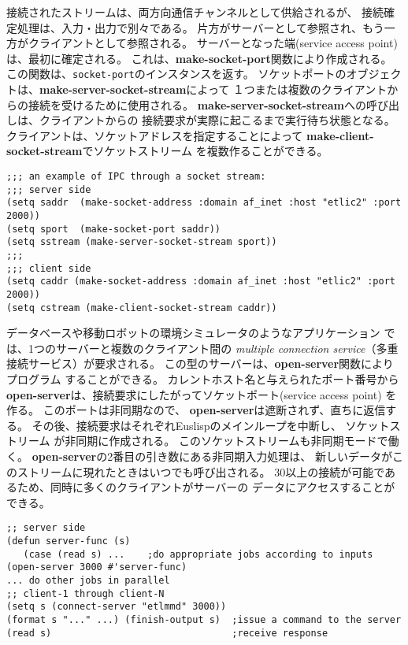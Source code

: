 接続されたストリームは、両方向通信チャンネルとして供給されるが、
接続確定処理は、入力・出力で別々である。
片方がサーバーとして参照され、もう一方がクライアントとして参照される。
サーバーとなった端(service access point)は、最初に確定される。
これは、{\bf make-socket-port}関数により作成される。
この関数は、{\tt socket-port}のインスタンスを返す。
ソケットポートのオブジェクトは、{\bf make-server-socket-stream}によって
１つまたは複数のクライアントからの接続を受けるために使用される。
{\bf make-server-socket-stream}への呼び出しは、クライアントからの
接続要求が実際に起こるまで実行待ち状態となる。
クライアントは、ソケットアドレスを指定することによって
{\bf make-client-socket-stream}でソケットストリーム
を複数作ることができる。

\begin{verbatim}
;;; an example of IPC through a socket stream:
;;; server side
(setq saddr  (make-socket-address :domain af_inet :host "etlic2" :port 2000))
(setq sport  (make-socket-port saddr))
(setq sstream (make-server-socket-stream sport))
;;;
;;; client side
(setq caddr (make-socket-address :domain af_inet :host "etlic2" :port 2000))
(setq cstream (make-client-socket-stream caddr))
\end{verbatim}

データベースや移動ロボットの環境シミュレータのようなアプリケーション
では、1つのサーバーと複数のクライアント間の
{\em multiple connection service}（多重接続サービス）が要求される。
この型のサーバーは、{\bf open-server}関数によりプログラム
することができる。
カレントホスト名と与えられたポート番号から
{\bf open-server}は、接続要求にしたがってソケットポート(service access point)
を作る。
このポートは非同期なので、
{\bf open-server}は遮断されず、直ちに返信する。
その後、接続要求はそれぞれEuslispのメインループを中断し、
ソケットストリーム が非同期に作成される。
このソケットストリームも非同期モードで働く。
{\bf open-server}の2番目の引き数にある非同期入力処理は、
新しいデータがこのストリームに現れたときはいつでも呼び出される。
30以上の接続が可能であるため、同時に多くのクライアントがサーバーの
データにアクセスすることができる。

\begin{verbatim}
;; server side
(defun server-func (s) 
   (case (read s) ...    ;do appropriate jobs according to inputs
(open-server 3000 #'server-func)
... do other jobs in parallel
;; client-1 through client-N
(setq s (connect-server "etlmmd" 3000))
(format s "..." ...) (finish-output s)	;issue a command to the server
(read s)                                ;receive response
\end{verbatim}

